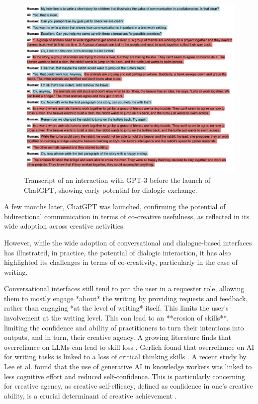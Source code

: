 \begin{figure}[H]
    \centering
    \includegraphics[width=1\linewidth]{transcriptgenchi.png}
    \caption{Transcript of an interaction with GPT-3 before the launch of ChatGPT, showing early potential for dialogic exchange.}
    \label{fig:genchi_transcript}
\end{figure}

A few months later, ChatGPT was launched, confirming the potential of bidirectional communication in terms of co-creative usefulness, as reflected in its wide adoption across creative activities.

However, while the wide adoption of conversational and dialogue-based interfaces has illustrated, in practice, the potential of dialogic interaction, it has also highlighted its challenges in terms of co-creativity, particularly in the case of writing.

Conversational interfaces still tend to put the user in a requester role, allowing them to mostly engage *about* the writing by providing requests and feedback, rather than engaging *at the level of writing* itself. This limits the user's involvement at the writing level. This can lead to an **erosion of skills**, limiting the confidence and ability of practitioners to turn their intentions into outputs, and in turn, their creative agency. A growing literature finds that overreliance on LLMs can lead to skill loss \cite{Heersmink2024-mk, Rafner2021-tm}. Gerlich found that overreliance on AI for writing tasks is linked to a loss of critical thinking skills \cite{Gerlich2025-as}. A recent study by Lee et al. \cite{Lee2025-dw} found that the use of generative AI in knowledge workers was linked to less cognitive effort and reduced self-confidence. This is particularly concerning for creative agency, as creative self-efficacy, defined as confidence in one's creative ability, is a crucial determinant of creative achievement \cite{Tierney2002-xp}.


